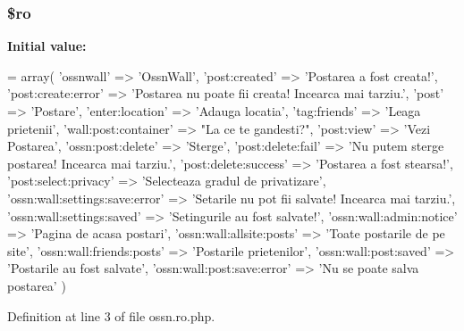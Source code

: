 \subsubsection[{\texorpdfstring{\$ro}{$ro}}]{\setlength{\rightskip}{0pt plus 5cm}\$ro}\hypertarget{components_2_ossn_wall_2locale_2ossn_8ro_8php_ad432e1965f7fa8ce0807b244734e70f8}{}\label{components_2_ossn_wall_2locale_2ossn_8ro_8php_ad432e1965f7fa8ce0807b244734e70f8}
{\bfseries Initial value\+:}
\begin{DoxyCode}
= array(
        \textcolor{stringliteral}{'ossnwall'} => \textcolor{stringliteral}{'OssnWall'},
        \textcolor{stringliteral}{'post:created'} => \textcolor{stringliteral}{'Postarea a fost creata!'},
        \textcolor{stringliteral}{'post:create:error'} => \textcolor{stringliteral}{'Postarea nu poate fii creata! Incearca mai tarziu.'},
        \textcolor{stringliteral}{'post'} => \textcolor{stringliteral}{'Postare'},
        \textcolor{stringliteral}{'enter:location'} => \textcolor{stringliteral}{'Adauga locatia'},
        \textcolor{stringliteral}{'tag:friends'} => \textcolor{stringliteral}{'Leaga prietenii'},
        \textcolor{stringliteral}{'wall:post:container'} => \textcolor{stringliteral}{"La ce te gandesti?"},
        \textcolor{stringliteral}{'post:view'} => \textcolor{stringliteral}{'Vezi Postarea'},
        \textcolor{stringliteral}{'ossn:post:delete'} => \textcolor{stringliteral}{'Sterge'},
        \textcolor{stringliteral}{'post:delete:fail'} => \textcolor{stringliteral}{'Nu putem sterge postarea! Incearca mai tarziu.'},
        \textcolor{stringliteral}{'post:delete:success'} => \textcolor{stringliteral}{'Postarea a fost stearsa!'},
        \textcolor{stringliteral}{'post:select:privacy'} => \textcolor{stringliteral}{'Selecteaza gradul de privatizare'},
        \textcolor{stringliteral}{'ossn:wall:settings:save:error'} => \textcolor{stringliteral}{'Setarile nu pot fii salvate! Incearca mai tarziu.'},
        \textcolor{stringliteral}{'ossn:wall:settings:saved'} => \textcolor{stringliteral}{'Setingurile au fost salvate!'},
        \textcolor{stringliteral}{'ossn:wall:admin:notice'} => \textcolor{stringliteral}{'Pagina de acasa postari'},
        \textcolor{stringliteral}{'ossn:wall:allsite:posts'} => \textcolor{stringliteral}{'Toate postarile de pe site'},
        \textcolor{stringliteral}{'ossn:wall:friends:posts'} => \textcolor{stringliteral}{'Postarile prietenilor'},
        \textcolor{stringliteral}{'ossn:wall:post:saved'} => \textcolor{stringliteral}{'Postarile au fost salvate'},
        \textcolor{stringliteral}{'ossn:wall:post:save:error'} => \textcolor{stringliteral}{'Nu se poate salva postarea'}
)
\end{DoxyCode}


Definition at line 3 of file ossn.\+ro.\+php.

